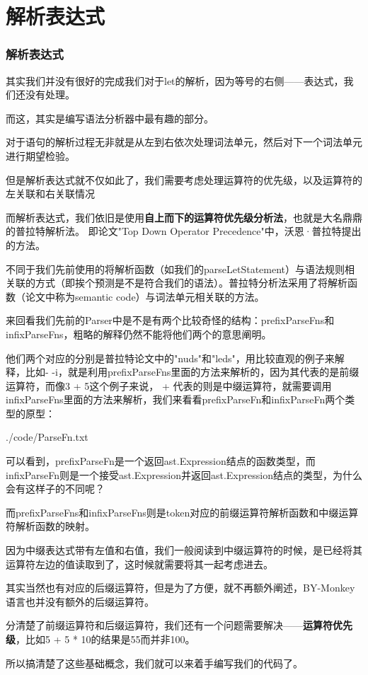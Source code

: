 \documentclass{beamer}
\begin{document}
	\section{解析表达式}
	\begin{frame}
		\frametitle{解析表达式}
		
		其实我们并没有很好的完成我们对于let的解析，因为等号的右侧——表达式，我们还没有处理。
		
		而这，其实是编写语法分析器中最有趣的部分。
		
		对于语句的解析过程无非就是从左到右依次处理词法单元，然后对下一个词法单元进行期望检验。
		
		但是解析表达式就不仅如此了，我们需要考虑处理运算符的优先级，以及运算符的左关联和右关联情况
		
		而解析表达式，我们依旧是使用\textbf{自上而下的运算符优先级分析法}，也就是大名鼎鼎的普拉特解析法。
		即论文"Top Down Operator Precedence"中，沃恩·普拉特提出的方法。
		
		不同于我们先前使用的将解析函数（如我们的parseLetStatement）与语法规则相关联的方式（即挨个预测是不是符合我们的语法）。普拉特分析法采用了将解析函数（论文中称为semantic code）与词法单元相关联的方法。
	\end{frame}
	\begin{frame}
		来回看我们先前的Parser中是不是有两个比较奇怪的结构：prefixParseFns和infixParseFns，粗略的解释仍然不能将他们两个的意思阐明。
		
		他们两个对应的分别是普拉特论文中的"nuds"和"leds"，用比较直观的例子来解释，比如- -i，就是利用prefixParseFns里面的方法来解析的，因为其代表的是前缀运算符，而像3 + 5这个例子来说， + 代表的则是中缀运算符，就需要调用infixParseFns里面的方法来解析，我们来看看prefixParseFn和infixParseFn两个类型的原型：
		
		
		{./code/ParseFn.txt}		
	\end{frame}
	\begin{frame}
		可以看到，prefixParseFn是一个返回ast.Expression结点的函数类型，而infixParseFn则是一个接受ast.Expression并返回ast.Expression结点的类型，为什么会有这样子的不同呢？
		
		而prefixParseFns和infixParseFns则是token对应的前缀运算符解析函数和中缀运算符解析函数的映射。
		
		因为中缀表达式带有左值和右值，我们一般阅读到中缀运算符的时候，是已经将其运算符左边的值读取到了，这时候就需要将其一起考虑进去。
		
		其实当然也有对应的后缀运算符，但是为了方便，就不再额外阐述，BY-Monkey语言也并没有额外的后缀运算符。
		
		分清楚了前缀运算符和后缀运算符，我们还有一个问题需要解决——\textbf{运算符优先级}，比如5 + 5 * 10的结果是55而并非100。
		
		所以搞清楚了这些基础概念，我们就可以来着手编写我们的代码了。
	\end{frame}
\end{document}
